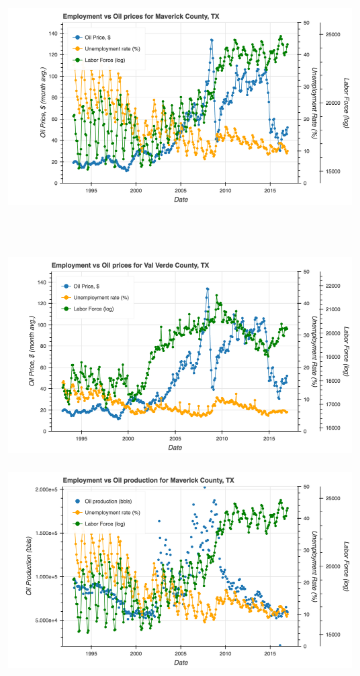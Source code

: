 \documentclass[11pt,letterpaper]{article}
\begin{document}
\begin{figure}
\centering
\begin{subfigure}{0.6\textwidth}
\includegraphics[width=\linewidth]{tx_maverick_oil_price}
\end{subfigure}
~
\begin{subfigure}{0.6\textwidth}
\includegraphics[width=\linewidth]{tx_valverde_oil_price}
\end{subfigure}

\begin{subfigure}{0.6\textwidth}
\includegraphics[width=\linewidth]{tx_maverick_oil_prod}
\end{subfigure}


\end{figure}
\end{document}

